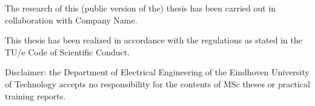 \documentclass[12pt,a4paper]{article}
\begin{document}
\vspace{1cm}

{\small The research of this (public version of the) thesis has been carried out in collaboration with Company Name.}

\vspace{0.4cm}
{\small This thesis has been realized in accordance with the regulations as stated in the TU/e Code of Scientific Conduct.}

\vspace{0.4cm}

{\small Disclaimer: the Department of Electrical Engineering of the Eindhoven University of Technology accepts no responsibility for the contents of MSc theses or practical training reports.}

\vfill
\end{document}

